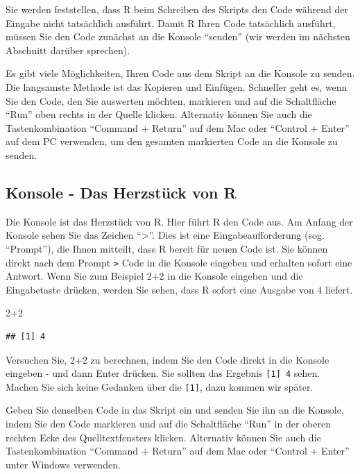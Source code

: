 \documentclass[
]{book}
\newenvironment{Shaded}{\begin{snugshade}}{\end{snugshade}}
\newcommand{\DecValTok}[1]{\textcolor[rgb]{0.00,0.00,0.81}{#1}}
\newcommand{\SpecialCharTok}[1]{\textcolor[rgb]{0.00,0.00,0.00}{#1}}
\begin{document}
Sie werden feststellen, dass R beim Schreiben des Skripts den Code während der Eingabe nicht tatsächlich ausführt. Damit R Ihren Code tatsächlich ausführt, müssen Sie den Code zunächst an die Konsole ``senden'' (wir werden im nächsten Abschnitt darüber sprechen).

Es gibt viele Möglichkeiten, Ihren Code aus dem Skript an die Konsole zu senden. Die langsamste Methode ist das Kopieren und Einfügen. Schneller geht es, wenn Sie den Code, den Sie auswerten möchten, markieren und auf die Schaltfläche ``Run'' oben rechts in der Quelle klicken. Alternativ können Sie auch die Tastenkombination ``Command + Return'' auf dem Mac oder ``Control + Enter'' auf dem PC verwenden, um den gesamten markierten Code an die Konsole zu senden.

\hypertarget{konsole---das-herzstuxfcck-von-r}{%
\subsection{Konsole - Das Herzstück von R}\label{konsole---das-herzstuxfcck-von-r}}

Die Konsole ist das Herzstück von R. Hier führt R den Code aus. Am Anfang der Konsole sehen Sie das Zeichen ``\textgreater{}''. Dies ist eine Eingabeaufforderung (sog. ``Prompt''), die Ihnen mitteilt, dass R bereit für neuen Code ist. Sie können direkt nach dem Prompt \texttt{\textgreater{}} Code in die Konsole eingeben und erhalten sofort eine Antwort. Wenn Sie zum Beispiel 2+2 in die Konsole eingeben und die Eingabetaste drücken, werden Sie sehen, dass R sofort eine Ausgabe von 4 liefert.

\begin{Shaded}
\begin{Highlighting}[]
\DecValTok{2}\SpecialCharTok{+}\DecValTok{2}
\end{Highlighting}
\end{Shaded}

\begin{verbatim}
## [1] 4
\end{verbatim}

Versuchen Sie, 2+2 zu berechnen, indem Sie den Code direkt in die Konsole eingeben - und dann Enter drücken.
Sie sollten das Ergebnis \texttt{{[}1{]}\ 4} sehen. Machen Sie sich keine Gedanken über die \texttt{{[}1{]}}, dazu kommen wir später.

Geben Sie denselben Code in das Skript ein und senden Sie ihn an die Konsole, indem Sie den Code markieren und auf die Schaltfläche ``Run'' in der oberen rechten Ecke des Quelltextfensters klicken. Alternativ können Sie auch die Tastenkombination ``Command + Return'' auf dem Mac oder ``Control + Enter'' unter Windows verwenden.
\end{document}
